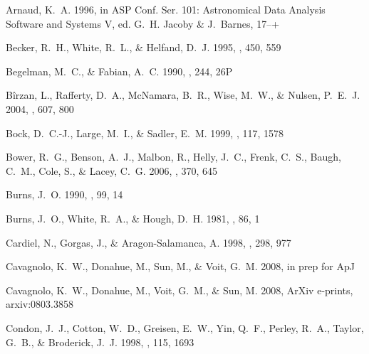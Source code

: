 \documentclass[12pt,preprint]{aastex}
\begin{document}
\begin{thebibliography}{} %

{Arnaud}, K.~A. 1996, in ASP Conf. Ser. 101: Astronomical Data Analysis
  Software and Systems V, ed. G.~H. {Jacoby} \& J.~{Barnes}, 17--+

{Becker}, R.~H., {White}, R.~L., \& {Helfand}, D.~J. 1995, \apj, 450, 559

{Begelman}, M.~C., \& {Fabian}, A.~C. 1990, \mnras, 244, 26P

{B{\^i}rzan}, L., {Rafferty}, D.~A., {McNamara}, B.~R., {Wise}, M.~W., \&
  {Nulsen}, P.~E.~J. 2004, \apj, 607, 800

{Bock}, D.~C.-J., {Large}, M.~I., \& {Sadler}, E.~M. 1999, \aj, 117, 1578

{Bower}, R.~G., {Benson}, A.~J., {Malbon}, R., {Helly}, J.~C., {Frenk}, C.~S.,
  {Baugh}, C.~M., {Cole}, S., \& {Lacey}, C.~G. 2006, \mnras, 370, 645

{Burns}, J.~O. 1990, \aj, 99, 14

{Burns}, J.~O., {White}, R.~A., \& {Hough}, D.~H. 1981, \aj, 86, 1

{Cardiel}, N., {Gorgas}, J., \& {Aragon-Salamanca}, A. 1998, \mnras, 298, 977

{Cavagnolo}, K.~W., {Donahue}, M., {Sun}, M., \& {Voit}, G.~M.
  2008{}, in prep for ApJ

{Cavagnolo}, K.~W., {Donahue}, M., {Voit}, G.~M., \& {Sun}, M.
  2008{}, ArXiv e-prints, arxiv:0803.3858

{Condon}, J.~J., {Cotton}, W.~D., {Greisen}, E.~W., {Yin}, Q.~F., {Perley},
  R.~A., {Taylor}, G.~B., \& {Broderick}, J.~J. 1998, \aj, 115, 1693


\end{thebibliography}
\end{document}
